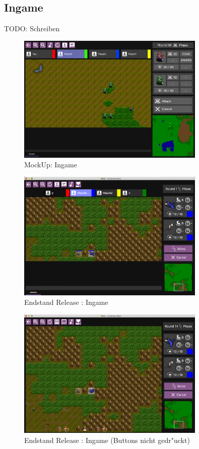\documentclass[12pt, titlepage]{scrartcl}
\newcommand{\RN}[1]{%
	\textup{\uppercase\expandafter{\romannumeral#1}}%
}
\begin{document}
		\subsection{Ingame}
			TODO: Schreiben
			\begin{figure}[H] 
				\centering
				\includegraphics[width=0.8\textwidth]{images/mockUps/Ingame.png}
				\caption{MockUp: Ingame}
				\label{Ingame_View_2}
			\end{figure}
			\begin{figure}[H] 
				\centering
				\includegraphics[width=0.8\textwidth]{images/endOfRelease/Ingame.png}
				\caption{Endstand Release \RN{3}: Ingame}
				\label{End_Ingame_View}
			\end{figure}
			\begin{figure}[H] 
				\centering
				\includegraphics[width=0.8\textwidth]{images/endOfRelease/Ingame2.png}
				\caption{Endstand Release \RN{3}: Ingame (Buttons nicht gedr"uckt)}
				\label{End_Ingame_View_2}
			\end{figure}
\end{document}
